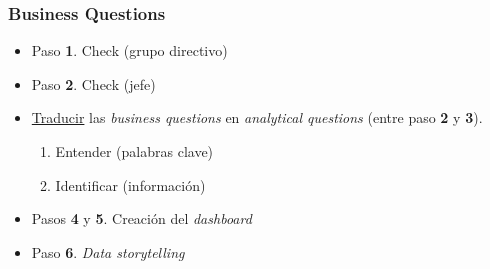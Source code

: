 \begin{frame}
    \frametitle{Business Questions}
    \begin{itemize}
        \item<1-> Paso \textbf{1}. Check (grupo directivo)
        \item<1-> Paso \textbf{2}. Check (jefe)
        \item<2-> \underline{Traducir} las \textit{business questions} en \textit{analytical questions} (entre paso \textbf{2} y \textbf{3}).
        \begin{enumerate}
            \item<3-> Entender (palabras clave)
            \item<4-> Identificar (información)
        \end{enumerate}
        \item<5-> Pasos \textbf{4} y \textbf{5}. Creación del \textit{dashboard}
        \item<6-> Paso \textbf{6}. \textit{Data storytelling}
    \end{itemize}
\end{frame}